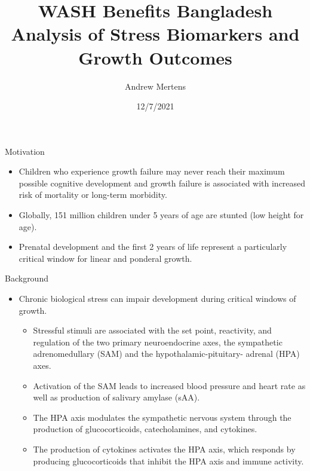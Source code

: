 \documentclass[
  ignorenonframetext,
]{beamer}
\title{WASH Benefits Bangladesh Analysis of Stress Biomarkers and Growth
Outcomes}
\author{Andrew Mertens}
\date{12/7/2021}
\providecommand{\tightlist}{%
  \setlength{\itemsep}{0pt}\setlength{\parskip}{0pt}}
\begin{document}
\frame{\titlepage}

\begin{frame}{Motivation}
\protect\hypertarget{motivation}{}
\begin{itemize}[<+->]
\tightlist
\item
  Children who experience growth failure may never reach their maximum
  possible cognitive development and growth failure is associated with
  increased risk of mortality or long-term morbidity.
\item
  Globally, 151 million children under 5 years of age are stunted (low
  height for age).
\item
  Prenatal development and the first 2 years of life represent a
  particularly critical window for linear and ponderal growth.
\end{itemize}
\end{frame}

\begin{frame}{Background}
\protect\hypertarget{background}{}
\begin{itemize}[<+->]
\tightlist
\item
  Chronic biological stress can impair development during critical
  windows of growth.

  \begin{itemize}[<+->]
  \tightlist
  \item
    Stressful stimuli are associated with the set point, reactivity, and
    regulation of the two primary neuroendocrine axes, the sympathetic
    adrenomedullary (SAM) and the hypothalamic-pituitary- adrenal (HPA)
    axes.
  \item
    Activation of the SAM leads to increased blood pressure and heart
    rate as well as production of salivary amylase (sAA).
  \item
    The HPA axis modulates the sympathetic nervous system through the
    production of glucocorticoids, catecholamines, and cytokines.
  \item
    The production of cytokines activates the HPA axis, which responds
    by producing glucocorticoids that inhibit the HPA axis and immune
    activity.
  \end{itemize}
\end{itemize}
\end{frame}
\end{document}
